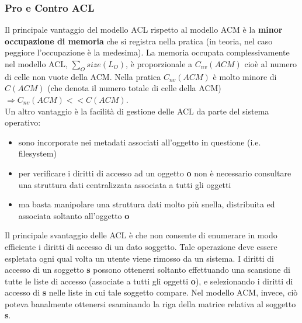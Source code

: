 \subsubsection{Pro e Contro ACL}
Il principale vantaggio del modello ACL rispetto al modello ACM è la \textbf{minor occupazione di memoria} che si registra nella pratica (in teoria, nel caso peggiore l'occupazione è la medesima). La memoria occupata complessivamente nel modello ACL, $\sum_{O} size(L_{O})$, è proporzionale a $C_{nv} (ACM)$ cioè al numero di celle non vuote della ACM. Nella pratica $C_{nv} (ACM)$ è molto minore di $C (ACM)$ (che denota il numero totale di celle della ACM) $\Rightarrow C_{nv} (ACM)<<C (ACM)$. \\
Un altro vantaggio è la facilità di gestione delle ACL da parte del sistema operativo:
\begin{itemize} 
  \item sono incorporate nei metadati associati all'oggetto in questione (i.e. filesystem)
  \item per verificare i diritti di accesso ad un oggetto \textbf{o} non è necessario consultare una struttura dati centralizzata associata a tutti gli oggetti
  \item ma basta manipolare una struttura dati molto più snella, distribuita ed associata soltanto all'oggetto \textbf{o}
\end{itemize}

Il principale svantaggio delle ACL è che non consente di enumerare in modo efficiente i diritti di accesso di un dato soggetto. Tale operazione deve essere espletata ogni qual volta un utente viene rimosso da un sistema. I diritti di accesso di un soggetto \textbf{s} possono ottenersi soltanto effettuando una scansione di tutte le liste di accesso (associate a tutti gli oggetti \textbf{o}), e selezionando i diritti di accesso di \textbf{s} nelle liste in cui tale soggetto compare. Nel modello ACM, invece, ciò poteva banalmente ottenersi esaminando la riga della matrice relativa al soggetto \textbf{s}.

